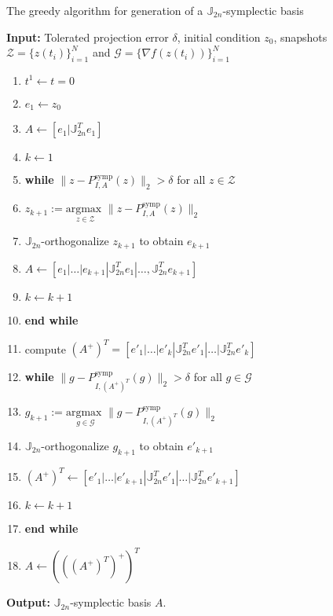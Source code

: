\begin{algorithm} 
\caption{The greedy algorithm for generation of a $\mathbb J_{2n}$-symplectic basis} \label{alg:1}
{\bf Input:} Tolerated projection error $\delta$, initial condition $ z_0$, snapshots $\mathcal Z = \{ z(t_i) \}_{i=1}^{N}$ and $\mathcal G = \{ \nabla f(z(t_i)) \}_{i=1}^{N}$
\begin{enumerate}
\item $t^1 \leftarrow t=0$
\item $e_1 \leftarrow z_0$
\item $A \leftarrow [e_1|\mathbb J^T_{2n}e_1]$
\item $k \leftarrow 1$
\item \textbf{while} $\| z - P^\text{symp}_{I,A}( z ) \|_2 > \delta$ for all $z\in \mathcal Z$
\item \hspace{0.5cm} $z_{k+1} := \underset{z\in \mathcal Z}{\text{argmax }} \| z - P^\text{symp}_{I,A}( z ) \|_2$
\item \hspace{0.5cm} $\mathbb J_{2n}$-orthogonalize $ z_{k+1}$ to obtain $e_{k+1}$
\item \hspace{0.5cm} $A \leftarrow [e_1|\dots |e_{k+1} | \mathbb J^T_{2n}e_1|\dots,\mathbb J^T_{2n}e_{k+1}]$
\item \hspace{0.5cm} $k \leftarrow k+1$
\item \textbf{end while}
\item compute $(A^+)^T=[e'_1|\dots|e'_k|\mathbb J^T_{2n}e'_1|\dots|\mathbb J^T_{2n}e'_k]$
\item \textbf{while} $\| g - P^\text{symp}_{I,(A^+)^T}(g) \|_2 > \delta$ for all $g \in \mathcal G$
\item \hspace{0.5cm} $g_{k+1} := \underset{g \in \mathcal G}{\text{argmax }} \| g - P^\text{symp}_{I,(A^+)^T}(g) \|_2$
\item \hspace{0.5cm} $\mathbb J_{2n}$-orthogonalize $g_{k+1}$ to obtain $e'_{k+1}$
\item \hspace{0.5cm} $(A^+)^T \leftarrow [e'_1|\dots |e'_{k+1} | \mathbb J^T_{2n}e'_1|\dots|\mathbb J^T_{2n}e'_{k+1}]$
\item \hspace{0.5cm} $k \leftarrow k+1$
\item \textbf{end while}
\item $A \leftarrow \left( \left( \left( A^+\right) ^T \right ) ^+ \right)^T$
\end{enumerate}
\vspace{0.5cm}
{\bf Output:} $\mathbb J_{2n}$-symplectic basis $A$.
\end{algorithm}
